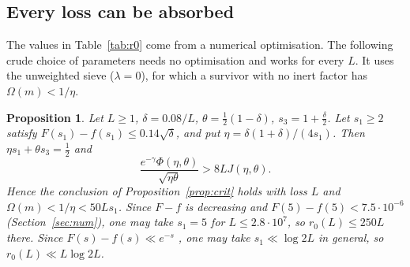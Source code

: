 \documentclass[11pt]{amsart}
\newtheorem{proposition}[theorem]{Proposition}
\theoremstyle{remark}
\begin{document}
\subsection{Every loss can be absorbed}
The values in Table~\ref{tab:r0} come from a numerical optimisation. The following crude choice of parameters needs no optimisation and works for every $L$. It uses the unweighted sieve ($\lambda=0$), for which a survivor with no inert factor has $\Omega(m)<1/\eta$.

\begin{proposition}\label{prop:allL}
Let $L\ge1$, $\delta=0.08/L$, $\theta=\frac12(1-\delta)$, $s_3=1+\frac\delta2$. Let $s_1\ge2$ satisfy $F(s_1)-f(s_1)\le0.14\sqrt\delta$, and put $\eta=\delta(1+\delta)/(4s_1)$. Then $\eta s_1+\theta s_3=\frac12$ and
\[
\frac{e^{-\gamma}\Phi(\eta,\theta)}{\sqrt{\eta\theta}}>8LJ(\eta,\theta).
\]
Hence the conclusion of Proposition~\ref{prop:crit} holds with loss $L$ and $\Omega(m)<1/\eta<50Ls_1$. Since $F-f$ is decreasing and $F(5)-f(5)<7.5\cdot10^{-6}$ (Section~\ref{sec:num}), one may take $s_1=5$ for $L\le2.8\cdot10^7$, so $r_0(L)\le250L$ there. Since $F(s)-f(s)\ll e^{-s}$ \cite[Ch.~11]{FI}, one may take $s_1\ll\log2L$ in general, so $r_0(L)\ll L\log 2L$.
\end{proposition}
\end{document}
